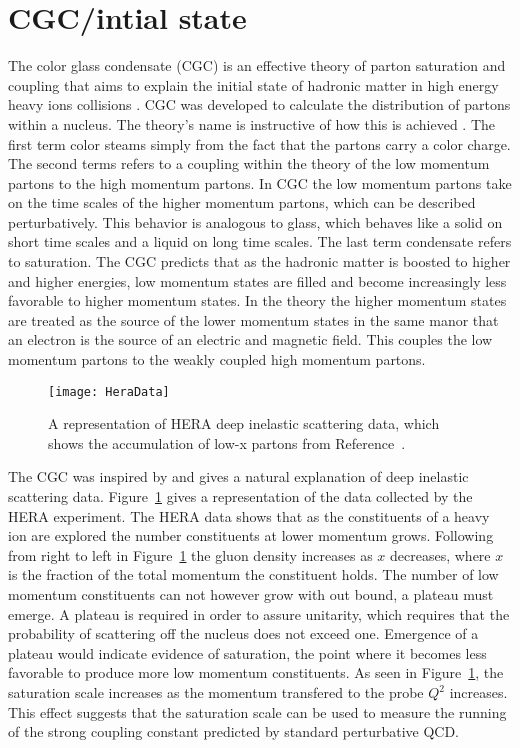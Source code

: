   \section{CGC/intial state}
  The color glass condensate (CGC) is an effective theory of parton saturation
  	and coupling that aims to explain the initial state of hadronic matter 
  	in high energy heavy ions collisions \cite{CGCandGlasma}. 
  CGC was developed to calculate the distribution of partons within a nucleus. 
  The theory's name is instructive of how this is achieved \cite{CGC2Lec}. 
  The first term color steams simply from the fact that the partons carry a color 
  	charge.
  The second terms refers to a coupling within the theory of the low momentum 
  	partons to the high momentum partons.
  In CGC the low momentum partons take on the time scales of the higher momentum 
  	partons, which can be described perturbatively. 
  This behavior is analogous to glass, which behaves like a solid on short time 
  	scales and a liquid on long time scales.
  The last term condensate refers to saturation.
  The CGC predicts that as the hadronic matter is boosted to higher and higher 
  	energies, low momentum states are filled and become increasingly less 
  	favorable to higher momentum states.
  In the theory the higher momentum states are treated as the source of the lower
  	momentum states in the same manor that an electron is the source of an
  	electric and magnetic field.
  This couples the low momentum partons to the weakly coupled high momentum 
  	partons. 
  
  \begin{figure}[h]
    \centering
      \texttt{[image: HeraData]}
    \caption{A representation of HERA deep inelastic scattering data, which shows
  	the accumulation of low-x partons from Reference~\cite{CGC2Lec}.}
    \label{HeraData}
  \end{figure}
  The CGC was inspired by and gives a natural explanation of deep inelastic
  	scattering data. 
  Figure~\ref{HeraData} gives a representation of the data collected by the HERA 
  	experiment. 
  The HERA data shows that as the constituents of a heavy ion are explored the
  	number constituents at lower momentum grows. 
  Following from right to left in Figure~\ref{HeraData} the gluon density
  	increases as $x$ decreases, where $x$ is the fraction of the total
  	momentum the constituent holds.
  The number of low momentum constituents can not however grow with out bound, a 
  	plateau must emerge.
  A plateau is required in order to assure unitarity, which requires that the
  	probability of scattering off the nucleus does not exceed one. 
  Emergence of a plateau would indicate evidence of saturation, the point where 
  	it becomes less favorable to produce more low momentum constituents. 
  As seen in Figure~\ref{HeraData}, the saturation scale increases as the momentum 
  	transfered to the probe $Q^2$ increases.
  This effect suggests that the saturation scale can be used to measure the 
  	running of the strong coupling constant predicted by standard
  	perturbative QCD.

